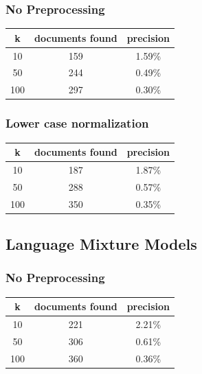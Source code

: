 \documentclass{article}
\begin{document}
\subsubsection{No Preprocessing}
\begin{center}
\begin{tabular}{|c|c|c|} \hline
\textbf{k} & \textbf{documents found} & \textbf{precision}\\ \hline
10 & 159 & 1.59\%\\
50 & 244 & 0.49\%\\
100 & 297 & 0.30\%\\ \hline

\end{tabular}
\end{center}

\subsubsection{Lower case normalization}
\begin{center}
\begin{tabular}{|c|c|c|} \hline
\textbf{k} & \textbf{documents found} & \textbf{precision}\\ \hline
10 & 187 & 1.87\%\\
50 & 288 & 0.57\%\\
100 & 350 & 0.35\%\\ \hline

\end{tabular}
\end{center}

\subsection{Language Mixture Models}
\subsubsection{No Preprocessing}
\begin{center}
\begin{tabular}{|c|c|c|} \hline
\textbf{k} & \textbf{documents found} & \textbf{precision}\\ \hline
10 & 221 & 2.21\%\\
50 & 306 & 0.61\%\\
100 & 360 & 0.36\%\\ \hline

\end{tabular}
\end{center}
\end{document}
